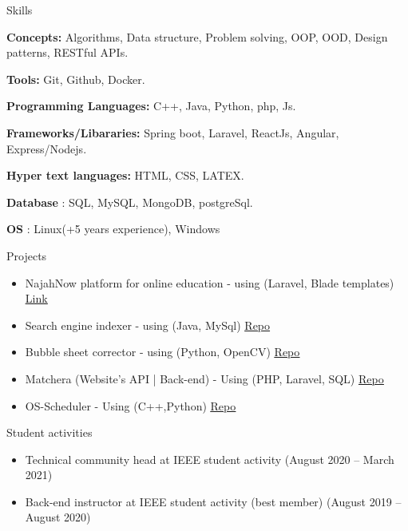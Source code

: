 \documentclass{resume}
\begin{document}

\begin{rSection}{Skills}
  \item \textbf{Concepts:} Algorithms, Data structure, Problem solving, OOP, OOD, Design patterns, RESTful APIs.
  \item \textbf{Tools:} Git, Github, Docker.
  \item \textbf{Programming Languages:} C++, Java, Python, php, Js.
  \item \textbf{Frameworks/Libararies:} Spring boot, Laravel, ReactJs, Angular, Express/Nodejs.
  \item \textbf{Hyper text languages:} HTML, CSS, LATEX.
  \item \textbf{Database}  : SQL, MySQL, MongoDB, postgreSql.
  \item \textbf{OS} : Linux(+5 years experience), Windows
\end{rSection}

\begin{rSection}{Projects}
  \begin{itemize}
    \item NajahNow platform for online education - using (Laravel, Blade templates) \hfill{\underline{\href{https://najahnow.net}{Link}}}
    \item Search engine indexer - using (Java, MySql) \hfill{\underline{\href{https://github.com/sofyanmahmoud0000/Jindexer}{Repo}}}
    \item Bubble sheet corrector  - using (Python, OpenCV) \hfill{\underline{\href{https://github.com/sofyanmahmoud0000/BSCorrector}{Repo}}}
    \item Matchera (Website's API | Back-end) - Using (PHP, Laravel, SQL) \hfill{\underline{\href{https://github.com/sofyanmahmoud0000/Matchera}{Repo}}}
    \item OS-Scheduler - Using (C++,Python) \hfill{\underline{\href{https://github.com/sofyanmahmoud0000/OS-Scheduler}{Repo}}}
  \end{itemize}
\end{rSection}

\begin{rSection}{Student activities}
  \begin{itemize}
    \item Technical community head at IEEE student activity \hfill{(August 2020 – March 2021)}
    \item Back-end instructor at IEEE student activity (best member) \hfill{(August 2019 – August 2020)}
  \end{itemize}
\end{rSection}
\end{document}

